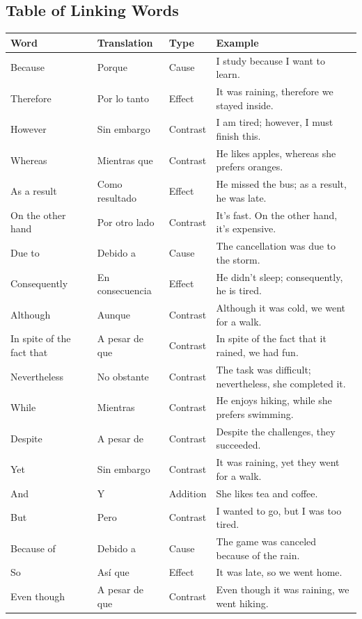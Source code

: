 \subsection{Table of Linking Words}
\begin{longtable}{|p{3cm}|p{2.5cm}|p{2cm}|p{5cm}|}
    \hline
    \textbf{Word} & \textbf{Translation} & \textbf{Type} & \textbf{Example} \\ \hline
    \endhead
    Because & Porque & Cause & I study because I want to learn. \\ \hline
    Therefore & Por lo tanto & Effect & It was raining, therefore we stayed inside. \\ \hline
    However & Sin embargo & Contrast & I am tired; however, I must finish this. \\ \hline
    Whereas & Mientras que & Contrast & He likes apples, whereas she prefers oranges. \\ \hline
    As a result & Como resultado & Effect & He missed the bus; as a result, he was late. \\ \hline
    On the other hand & Por otro lado & Contrast & It's fast. On the other hand, it's expensive. \\ \hline
    Due to & Debido a & Cause & The cancellation was due to the storm. \\ \hline
    Consequently & En consecuencia & Effect & He didn't sleep; consequently, he is tired. \\ \hline
    Although & Aunque & Contrast & Although it was cold, we went for a walk. \\ \hline
    In spite of the fact that & A pesar de que & Contrast & In spite of the fact that it rained, we had fun. \\ \hline
    Nevertheless & No obstante & Contrast & The task was difficult; nevertheless, she completed it. \\ \hline
    While & Mientras & Contrast & He enjoys hiking, while she prefers swimming. \\ \hline
    Despite & A pesar de & Contrast & Despite the challenges, they succeeded. \\ \hline
    Yet & Sin embargo & Contrast & It was raining, yet they went for a walk. \\ \hline
    And & Y & Addition & She likes tea and coffee. \\ \hline
    But & Pero & Contrast & I wanted to go, but I was too tired. \\ \hline
    Because of & Debido a & Cause & The game was canceled because of the rain. \\ \hline
    So & Así que & Effect & It was late, so we went home. \\ \hline
    Even though & A pesar de que & Contrast & Even though it was raining, we went hiking. \\ \hline
\end{longtable}

